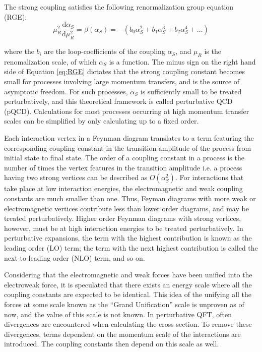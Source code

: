 \documentclass[12pt,a4paper,openright,twoside]{report}
\newcommand{\myequations}[1]{%
\addcontentsline{equ}{myequations}{\protect\numberline{\theequation}#1}\par}
\begin{document}
The strong coupling satisfies the following renormalization group equation (RGE):
\begin{equation}\label{eq:RGE}
\mu_R^2\frac{\mathrm{d}\alpha_S}{\mathrm{d}\mu_R^2} = \beta(\alpha_S) = -(b_0\alpha_S^2 + b_1\alpha_S^3 + b_2\alpha_S^4 + ...)
\end{equation}
\myequations{Renormalization Group Equation}
where the $b_i$ are the loop-coefficients of the coupling $\alpha_S$, and $\mu_R$ is the renomalization scale, of which $\alpha_S$ is a function. The minus sign on the right hand side of Equation \ref{eq:RGE} dictates that the strong coupling constant becomes small for processes involving large momentum transfers, and is the source of asymptotic freedom. For such processes, $\alpha_S$ is sufficiently small to be treated perturbatively, and this theoretical framework is called perturbative QCD (pQCD). Calculations for most processes occurring at high momentum transfer scales can be simplified by only calculating up to a fixed order.

Each interaction vertex in a Feynman diagram translates to a term featuring the corresponding coupling constant in the transition amplitude of the process from initial state to final state. The order of a coupling constant in a process is the number of times the vertex features in the transition amplitude i.e. a process having two strong vertices can be described as $O(\alpha_{S}^2)$. For interactions that take place at low interaction energies, the electromagnetic and weak coupling constants are much smaller than one. Thus, Feyman diagrams with more weak or electromagnetic vertices contribute less than lower order diagrams, and may be treated perturbatively. Higher order Feynman diagrams with strong vertices, however, must be at high interaction energies to be treated perturbatively. In perturbative expansions, the term with the highest contribution is known as the leading order (LO) term; the term with the next highest contribution is called the next-to-leading order (NLO) term, and so on.

Considering that the electromagnetic and weak forces have been unified into the electroweak force, it is speculated that there exists an energy scale where all the coupling constants are expected to be identical. This idea of the unifying all the forces at some scale known as the ``Grand Unification'' scale is unproven as of now, and the value of this scale is not known. In perturbative QFT, often divergences are encountered when calculating the cross section. To remove these divergences, terms dependent on the momentum scale of the interactions are introduced. The coupling constants then depend on this scale as well.
\end{document}
